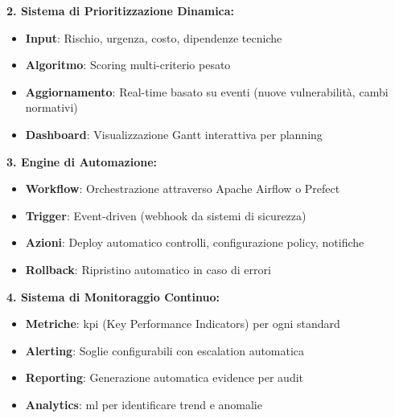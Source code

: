 \textbf{2. Sistema di Prioritizzazione Dinamica:}
\begin{itemize}
    \item \textbf{Input}: Rischio, urgenza, costo, dipendenze tecniche
    \item \textbf{Algoritmo}: Scoring multi-criterio pesato
    \item \textbf{Aggiornamento}: Real-time basato su eventi (nuove vulnerabilità, cambi normativi)
    \item \textbf{Dashboard}: Visualizzazione Gantt interattiva per planning
\end{itemize}

\textbf{3. Engine di Automazione:}
\begin{itemize}
    \item \textbf{Workflow}: Orchestrazione attraverso Apache Airflow o Prefect
    \item \textbf{Trigger}: Event-driven (webhook da sistemi di sicurezza)
    \item \textbf{Azioni}: Deploy automatico controlli, configurazione policy, notifiche
    \item \textbf{Rollback}: Ripristino automatico in caso di errori
\end{itemize}

\textbf{4. Sistema di Monitoraggio Continuo:}
\begin{itemize}
    \item \textbf{Metriche}: \gls{kpi} (Key Performance Indicators) per ogni standard
    \item \textbf{Alerting}: Soglie configurabili con escalation automatica
    \item \textbf{Reporting}: Generazione automatica evidence per audit
    \item \textbf{Analytics}: \gls{ml} per identificare trend e anomalie
\end{itemize}

